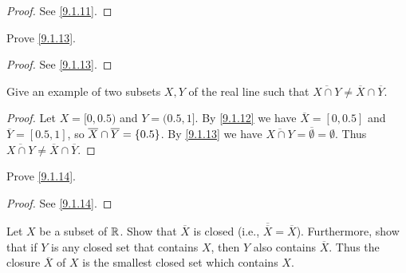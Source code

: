 \begin{proof}
  See \cref{9.1.11}.
\end{proof}

\begin{ex}\label{ex:9.1.3}
  Prove \cref{9.1.13}.
\end{ex}

\begin{proof}
  See \cref{9.1.13}.
\end{proof}

\begin{ex}\label{ex:9.1.4}
  Give an example of two subsets \(X, Y\) of the real line such that \(\overline{X \cap Y} \neq \overline{X} \cap \overline{Y}\).
\end{ex}

\begin{proof}
  Let \(X = [0, 0.5)\) and \(Y = (0.5, 1]\).
  By \cref{9.1.12} we have \(\overline{X} = [0, 0.5]\) and \(\overline{Y} = [0.5, 1]\), so \(\overline{X} \cap \overline{Y} = \left\lbrace0.5\right\rbrace\).
  By \cref{9.1.13} we have \(\overline{X \cap Y} = \overline{\emptyset} = \emptyset\).
  Thus \(\overline{X \cap Y} \neq \overline{X} \cap \overline{Y}\).
\end{proof}

\begin{ex}\label{ex:9.1.5}
  Prove \cref{9.1.14}.
\end{ex}

\begin{proof}
  See \cref{9.1.14}.
\end{proof}

\begin{ex}\label{ex:9.1.6}
  Let \(X\) be a subset of \(\mathbb{R}\).
  Show that \(\overline{X}\) is closed (i.e., \(\overline{\overline{X}} = \overline{X}\)).
  Furthermore, show that if \(Y\) is any closed set that contains \(X\), then \(Y\) also contains \(\overline{X}\).
  Thus the closure \(\overline{X}\) of \(X\) is the smallest closed set which contains \(X\).
\end{ex}

